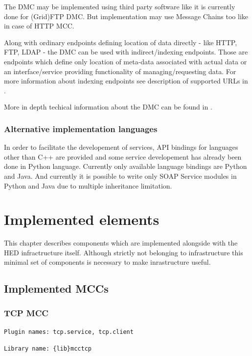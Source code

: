 \documentclass{book}
\begin{document}
The DMC may be implemented using third party software like it is currently done for (Grid)FTP DMC. But implementation may use Message Chains too like in case of HTTP MCC.

Along with ordinary endpoints defining location of data directly - like HTTP, FTP, LDAP - the DMC can be used with indirect/indexing endpoints. Those are endpoints which define only location of meta-data associated with actual data or an interface/service providing functionality of managing/requesting data. For more information about indexing endpoints see description of supported URLs in \cite{urls}.

More in depth techical information about the DMC can be found in \cite{dmc}.


\subsection{Alternative implementation languages}

In order to facilitate the developement of services, API bindings for languages other than C++ are provided and some service developement has already been done in Python language. Currently only available language bindings are Python and Java. And currently it is possible to write only SOAP Service modules in Python and Java due to multiple inheritance limitation.



\chapter{Implemented elements}

This chapter describes components which are implemented alongside with the HED infractructure itself. Although strictly not belonging to infrastructure this minimal set of components is necessary to make inrastructure useful.


\section{Implemented MCCs}


\subsection{TCP MCC}

\texttt{Plugin names: tcp.service, tcp.client}

\texttt{Library name: \{lib\}mcctcp}
\end{document}
